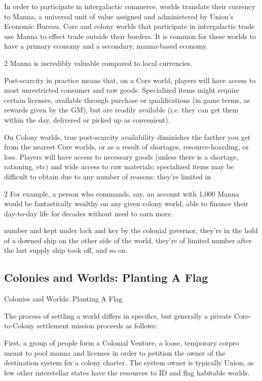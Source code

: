 In order to participate in intergalactic commerce, worlds translate their currency to Manna, a  
universal unit of value assigned and administered by Union’s Economic Bureau. Core and colony  
worlds that participate in intergalactic trade use Manna to effect trade outside their borders. It is  
common for these worlds to have a primary economy and a secondary, manna-based economy.  

                                                                       2 
Manna is incredibly valuable compared to local currencies. 
 

Post-scarcity in practice means that, on a Core world, players will have access to most  
unrestricted consumer and raw goods. Specialized items might require certain licenses, available  
through purchase or qualifications (in game terms, as rewards given by the GM), but are readily  
available (i.e. they can get them within the day, delivered or picked up as convenient).
 

On Colony worlds, true post-scarcity availability diminishes the farther you get from the nearest  
Core worlds, or as a result of shortages, resource-hoarding, or loss. Players will have access to  
necessary goods (unless there is a shortage, rationing, etc) and wide access to raw materials;  
specialized items may be difficult to obtain due to any number of reasons: they’re limited in  

2 For example, a person who commands, say, an account with 1,000 Manna would be fantastically wealthy  
on any given colony world, able to finance their day-to-day life for decades without need to earn more.  

                                                                                                                  


number and kept under lock and key by the colonial governor, they’re in the hold of a downed  
ship on the other side of the world, they’re of limited number after the last supply ship took off,  
and so on.      
 
\subsection{Colonies and Worlds: Planting A Flag}
Colonies and Worlds: Planting A Flag   

The process of settling a world differs in specifics, but generally a private Core-to-Colony  
settlement mission proceeds as follows:
 

First, a group of people form a Colonial Venture, a loose, temporary corpro meant to pool manna  
and licenses in order to petition the owner of the destination system for a colony charter. The  
system owner is typically Union, as few other interstellar states have the resources to ID and flag  
habitable worlds.  
 

